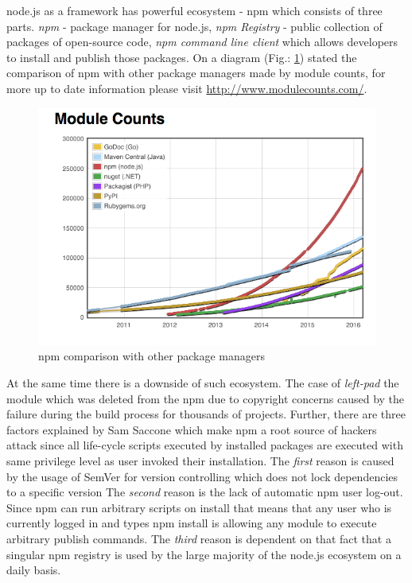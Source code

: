 node.js as a framework has powerful ecosystem - npm which consists of three parts. \textit{npm} - package manager for node.js, \textit{npm Registry} - public collection of packages of open-source code, \textit{npm command line client} which allows developers to install and publish those packages. On a diagram (Fig.: \ref{fig:npmStat}) stated the comparison of npm with other package managers made by module counts, for more up to date information please visit \url{http://www.modulecounts.com/}.
\begin{figure}[ht]
	\label{fig:npmStat}
	\centering
	\includegraphics[width=\textwidth]{grafiken/modulecounts.png}
	\caption{npm comparison with other package managers\cite{moduleCounts}}
\end{figure}

At the same time there is a downside of such ecosystem. The case of \textit{left-pad} the module which was deleted from the npm due to copyright concerns caused by the failure during the build process for thousands of projects\cite{npmDown}. Further, there are three factors explained by Sam Saccone \cite{npmHydra} \cite{npmSoft} which make npm a root source of hackers attack since all life-cycle scripts executed by installed packages are executed with same privilege level as user invoked their installation. The \textit{first} reason is caused by the usage of SemVer for version controlling which does not lock dependencies to a specific version The\textit{ second }reason is the lack of automatic npm user log-out.  Since npm can run arbitrary scripts on install that means that any user who is currently logged in and types npm install is allowing any module to execute arbitrary publish commands. The \textit{third} reason is dependent on that fact that a singular npm registry is used by the large majority of the node.js ecosystem on a daily basis.

